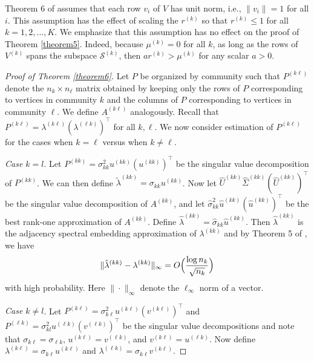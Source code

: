 \documentclass[12pt]{article}
\begin{document}
\begin{remark}
Theorem 6 of \citet{jmlr-v28-wang13} assumes that each row $v_i$
of $V$ has unit norm, i.e., $\|v_{i}\| = 1$  for all $i$. This
assumption has the effect of scaling the $r^{(k)}$ so that $r^{(k)}
\leq 1$ for all $k = 1,2,\dots,K$. We emphasize that this assumption
has no effect on the proof of Theorem \ref{theorem5}. Indeed,
because $\mu^{(k)} = 0$ for all $k$, as long as the rows of $V^{(k)}$
spans the subspace $\mathcal{S}^{(k)}$, then $a r^{(k)} > \mu^{(k)}$ 
for any scalar $a > 0$. 
\end{remark}

\begin{proof}[Proof of Theorem \ref{theorem6}] Let \(P\) be
organized by community such that \(P^{(k \ell)}\) denote the $n_k \times
n_{\ell}$ matrix obtained by keeping only the rows of $P$
corresponding to vertices in community $k$ and the columns of $P$
corresponding to vertices in community $\ell$. We define $A^{(k
  \ell)}$ analogously. Recall that $P^{(k \ell)} = \lambda^{(k \ell)} (\lambda^{(\ell k)})^{\top}$ for all $k, \ell$. We now consider estimation of $P^{(k \ell)}$
for the cases when $k = \ell$ versus when $k \not = \ell$.

\emph{Case \(k = l\)}. Let $P^{(kk)} =
\sigma_{kk}^2 u^{(kk)} (u^{(kk)})^\top$ be the singular value
decomposition of $P^{(kk)}$. We can then define
$\tilde{\lambda}^{(kk)} = \sigma_{kk} u^{(kk)}$. 
Now let $\hat{U}^{(kk)} \hat{\Sigma}^{(kk)} (\hat{U}^{(kk)})^\top$ be the
singular value decomposition of \(A^{(kk)}\), and let
$\hat{\sigma}_{kk}^2 \hat{u}^{(kk)} (\hat{u}^{(kk)})^\top$ be the
best rank-one approximation of $A^{(kk)}$. Define
\(\hat{\lambda}^{(kk)} = \hat{\sigma}_{kk} \hat{u}^{(kk)}\). Then
\(\hat{\lambda}^{(kk)}\) is the adjacency spectral embedding approximation of \(\lambda^{(kk)}\)
and by Theorem 5 of \citet{rubindelanchy2017statistical}, we have
$$\|\hat{\lambda}^{(kk)} - \lambda^{(kk)}\|_{\infty} = O\Bigl(\frac{\log n_k}{\sqrt{n_k}}\Bigr)$$
with high probability. 
Here $\|\cdot\|_{\infty}$ denote the $\ell_{\infty}$ norm of a vector.

\emph{Case \(k \neq l\)}. %
Let \(P^{(k \ell)} = \sigma_{k \ell}^2 u^{(k \ell)} (v^{(k \ell)})^\top\) and 
\(P^{(\ell k)} = \sigma_{kl}^2 u^{(\ell k)} (v^{(\ell k)})^\top\)  be the singular
value decompositions and note that \(\sigma_{k \ell} = \sigma_{\ell
  k}\), \(u^{(k \ell)} = v^{(\ell k)}\), and
\(v^{(k \ell)} = u^{(\ell k)}\). 
Now define \(\lambda^{(k \ell)} = \sigma_{k \ell} u^{(k \ell)}\) and
\(\lambda^{(\ell k)} = \sigma_{k \ell}
v^{(k \ell)}\).


\end{proof}
\end{document}
